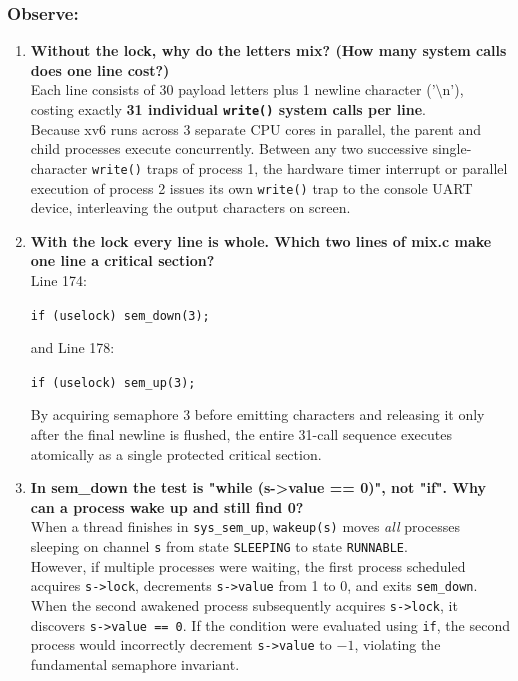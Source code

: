 \documentclass{labreport}
\begin{document}
\subsubsection*{Observe:}
\begin{enumerate}[leftmargin=*]
    \item \textbf{Without the lock, why do the letters mix? (How many system calls does one line cost?)}\\[0.2em]
    Each line consists of 30 payload letters plus 1 newline character ($\text{'\textbackslash n'}$), costing exactly \textbf{31 individual \texttt{write()} system calls per line}.\\
    Because xv6 runs across 3 separate CPU cores in parallel, the parent and child processes execute concurrently. Between any two successive single-character \texttt{write()} traps of process 1, the hardware timer interrupt or parallel execution of process 2 issues its own \texttt{write()} trap to the console UART device, interleaving the output characters on screen.

    \item \textbf{With the lock every line is whole. Which two lines of mix.c make one line a critical section?}\\[0.2em]
    Line 174:
    \begin{center}
        \texttt{if (uselock) sem\_down(3);}
    \end{center}
    and Line 178:
    \begin{center}
        \texttt{if (uselock) sem\_up(3);}
    \end{center}
    By acquiring semaphore 3 before emitting characters and releasing it only after the final newline is flushed, the entire 31-call sequence executes atomically as a single protected critical section.

    \item \textbf{In sem\_down the test is "while (s->value == 0)", not "if". Why can a process wake up and still find 0?}\\[0.2em]
    When a thread finishes in \texttt{sys\_sem\_up}, \texttt{wakeup(s)} moves \emph{all} processes sleeping on channel \texttt{s} from state \texttt{SLEEPING} to state \texttt{RUNNABLE}.\\
    However, if multiple processes were waiting, the first process scheduled acquires \texttt{s->lock}, decrements \texttt{s->value} from 1 to 0, and exits \texttt{sem\_down}. When the second awakened process subsequently acquires \texttt{s->lock}, it discovers \texttt{s->value == 0}. If the condition were evaluated using \texttt{if}, the second process would incorrectly decrement \texttt{s->value} to $-1$, violating the fundamental semaphore invariant.


\end{enumerate}
\end{document}
